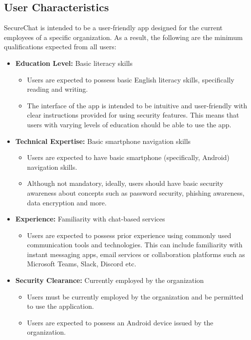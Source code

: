 \documentclass[]{article}
\begin{document}
\subsection{User Characteristics}
\label{sub:user_characteristics}
SecureChat is intended to be a user-friendly app designed for the current employees of a specific organization. As a result, the following are the minimum qualifications expected from all users:
\begin{itemize}
	\item \textbf{Education Level:} Basic literacy skills
 	\begin{itemize}
  		\item Users are expected to possess basic English literacy skills, specifically reading and writing.
    		\item The interface of the app is intended to be intuitive and user-friendly with clear instructions provided for using security features. This means that users with varying levels of education should be able to use the app.
      	\end{itemize}
 	\item \textbf{Technical Expertise:} Basic smartphone navigation skills
  	\begin{itemize}
   		\item Users are expected to have basic smartphone (specifically, Android) navigation skills.
     		\item Although not mandatory, ideally, users should have basic security awareness about concepts such as password security, phishing awareness, data encryption and more.
       	\end{itemize}
  	\item \textbf{Experience:} Familiarity with chat-based services
   	\begin{itemize}
    		\item Users are expected to possess prior experience using commonly used communication tools and technologies. This can include familiarity with instant messaging apps, email services or collaboration platforms such as Microsoft Teams, Slack, Discord etc.
      	\end{itemize}
   	\item \textbf{Security Clearance:} Currently employed by the organization
    	\begin{itemize}
     		\item Users must be currently employed by the organization and be permitted to use the application.
       		\item Users are expected to possess an Android device issued by the organization.
	\end{itemize}
\end{itemize}
\end{document}
